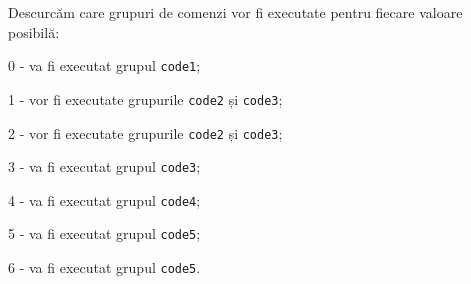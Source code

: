 Descurcăm care grupuri de comenzi vor fi executate pentru fiecare valoare posibilă:
\begin{icItems}
	\item 0 - va fi executat grupul \texttt{code1};
	\item 1 - vor fi executate grupurile \texttt{code2} și \texttt{code3};
	\item 2 - vor fi executate grupurile \texttt{code2} și \texttt{code3};
	\item 3 - va fi executat grupul \texttt{code3};
	\item 4 - va fi executat grupul \texttt{code4};
	\item 5 - va fi executat grupul \texttt{code5};
	\item 6 - va fi executat grupul \texttt{code5}.
\end{icItems}


